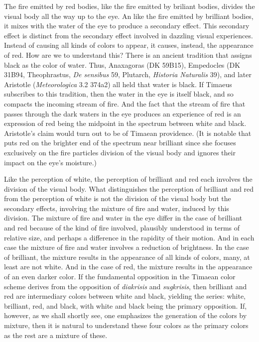 The fire emitted by red bodies, like the fire emitted by briliant bodies, divides the visual body all the way up to the eye. An like the fire emitted by brilliant bodies, it mixes with the water of the eye to produce a secondary effect. This secondary effect is distinct from the secondary effect involved in dazzling visual experiences. Instead of causing all kinds of colors to appear, it causes, instead, the appearance of red. How are we to understand this? There is an ancient tradition that assigns black as the color of water. Thus, Anaxagoras (DK 59B15), Empedocles (DK 31B94, Theophrastus, \emph{De sensibus} 59, Plutarch, \emph{Historia Naturalis} 39), and later Aristotle (\emph{Meteorologica} 3.2 374a2) all held that water is black. If Timaeus subscribes to this tradition, then the water in the eye is itself black, and so compacts the incoming stream of fire. And the fact that the stream of fire that passes through the dark waters in the eye produces an experience of red is an expression of red being the midpoint in the spectrum between white and black. Aristotle's claim would turn out to be of Timaean providence. (It is notable that \citealt[57]{James:1996pb} puts red on the brighter end of the spectrum near brilliant since she focuses exclusively on the fire particles division of the visual body and ignores their impact on the eye's moisture.)

Like the perception of white, the perception of brilliant and red each involves the division of the visual body. What distinguishes the perception of brilliant and red from the perception of white is not the division of the visual body but the secondary effects, involving the mixture of fire and water, induced by this division. The mixture of fire and water in the eye differ in the case of brilliant and red because of the kind of fire involved, plausibly understood in terms of relative size, and perhaps a difference in the rapidity of their motion. And in each case the mixture of fire and water involves a reduction of brightness. In the case of brilliant, the mixture results in the appearance of all kinds of colors, many, at least are not white. And in the case of red, the mixture results in the appearance of an even darker color. If the fundamental opposition in the Timaean color scheme derives from the opposition of \emph{diakrisis} and \emph{sugkrisis}, then brilliant and red are intermediary colors between white and black, yielding the series: white, brilliant, red, and black, with white and black being the primary opposition. If, however, as we shall shortly see, one emphasizes the generation of the colors by mixture, then it is natural to understand these four colors as the primary colors as the rest are a mixture of these.

